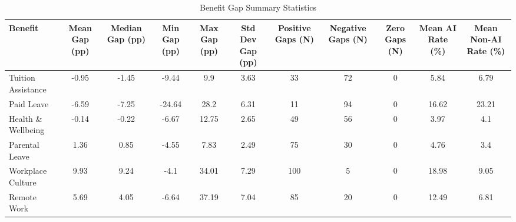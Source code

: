 \begin{landscape}
\begin{table}[htbp]
\tiny
\caption{Benefit Gap Summary Statistics}
\label{tab:gap_statistics}
\begin{tabular}{lcccccccccc}
\hline\hline
Benefit & Mean Gap (pp) & Median Gap (pp) & Min Gap (pp) & Max Gap (pp) & Std Dev Gap (pp) & Positive Gaps (N) & Negative Gaps (N) & Zero Gaps (N) & Mean AI Rate (\%) & Mean Non-AI Rate (\%) \\
\hline
Tuition Assistance & -0.95 & -1.45 & -9.44 & 9.9 & 3.63 & 33 & 72 & 0 & 5.84 & 6.79 \\
Paid Leave & -6.59 & -7.25 & -24.64 & 28.2 & 6.31 & 11 & 94 & 0 & 16.62 & 23.21 \\
Health \& Wellbeing & -0.14 & -0.22 & -6.67 & 12.75 & 2.65 & 49 & 56 & 0 & 3.97 & 4.1 \\
Parental Leave & 1.36 & 0.85 & -4.55 & 7.83 & 2.49 & 75 & 30 & 0 & 4.76 & 3.4 \\
Workplace Culture & 9.93 & 9.24 & -4.1 & 34.01 & 7.29 & 100 & 5 & 0 & 18.98 & 9.05 \\
Remote Work & 5.69 & 4.05 & -6.64 & 37.19 & 7.04 & 85 & 20 & 0 & 12.49 & 6.81 \\
\hline\hline
\end{tabular}
\end{table}
\end{landscape}
